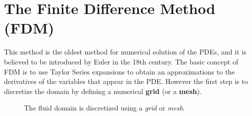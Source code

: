 \chapter{The Finite Difference Method (FDM)}

This method is the oldest method for numerical solution of the PDEs,
and it is believed to be introduced by Euler in the 18th century.
The basic concept of FDM is to use Taylor Series expansions to obtain an approximations to the derivatives of the variables that appear in the PDE.
However the first step is to discretize the domain by defining a numerical \textbf{grid} (or a \textbf{mesh}).
%
\begin{figure}[ht]
	\begin{center}
	\end{center}
	\caption{The fluid domain is discretized using a \emph{grid} or \emph{mesh}.}\label{fig:numerical-grid}
\end{figure}



